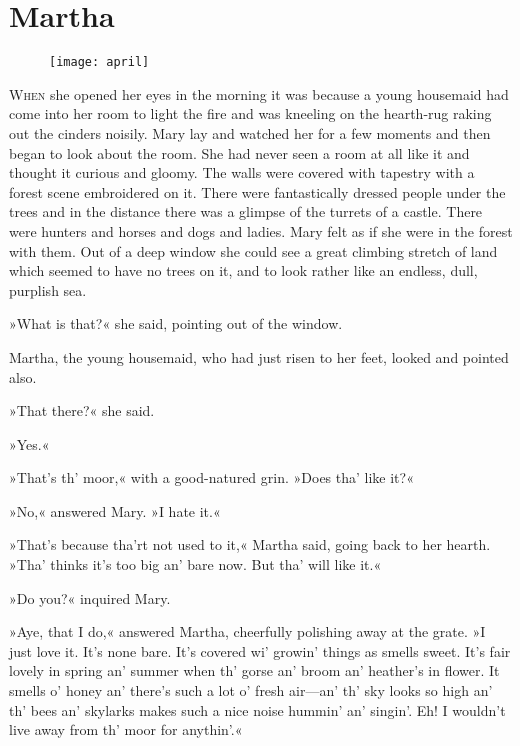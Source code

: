 \chapter{Martha} 
	
\begin{figure}[t!]
\centering
\texttt{[image: april]}
\end{figure}

	\lettrine[lines=6]{W}{hen} she opened her eyes in the morning it was because a young housemaid had come into her room to light the fire and was kneeling on the hearth-rug raking out the cinders noisily. Mary lay and watched her for a few moments and then began to look about the room. She had never seen a room at all like it and thought it curious and gloomy. The walls were covered with tapestry with a forest scene embroidered on it. There were fantastically dressed people under the trees and in the distance there was a glimpse of the turrets of a castle. There were hunters and horses and dogs and ladies. Mary felt as if she were in the forest with them. Out of a deep window she could see a great climbing stretch of land which seemed to have no trees on it, and to look rather like an endless, dull, purplish sea.

»What is that?« she said, pointing out of the window.

Martha, the young housemaid, who had just risen to her feet, looked and pointed also.

»That there?« she said.

»Yes.«

»That's th' moor,« with a good-natured grin. »Does tha' like it?«

»No,« answered Mary. »I hate it.«

»That's because tha'rt not used to it,« Martha said, going back to her hearth. »Tha' thinks it's too big an' bare now. But tha' will like it.«

»Do you?« inquired Mary.

»Aye, that I do,« answered Martha, cheerfully polishing away at the grate. »I just love it. It's none bare. It's covered wi' growin' things as smells sweet. It's fair lovely in spring an' summer when th' gorse an' broom an' heather's in flower. It smells o' honey an' there's such a lot o' fresh air—an' th' sky looks so high an' th' bees an' skylarks makes such a nice noise hummin' an' singin'. Eh! I wouldn't live away from th' moor for anythin'.«

